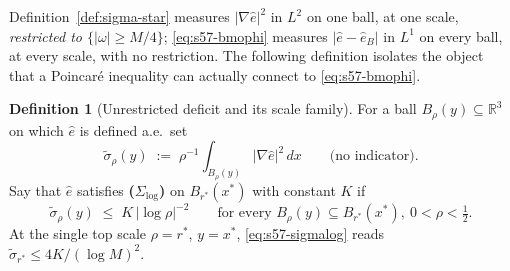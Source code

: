 \documentclass[11pt]{article}
\theoremstyle{definition}
\newtheorem{definition}[theorem]{Definition}
\theoremstyle{remark}
\newcommand{\R}{\mathbb{R}}
\begin{document}
Definition~\ref{def:sigma-star} measures $|\nabla\hat e|^2$ in $L^2$ on one
ball, at one scale, \emph{restricted to $\{|\omega|\geq M/4\}$};
\eqref{eq:s57-bmophi} measures $|\hat e-\hat e_B|$ in $L^1$ on every ball, at
every scale, with no restriction. The following definition isolates the
object that a Poincar\'e inequality can actually connect to
\eqref{eq:s57-bmophi}.

\begin{definition}[Unrestricted deficit and its scale family]
  \label{def:s57-sigma-tilde}
  For a ball $B_\rho(y)\subseteq\R^3$ on which $\hat e$ is defined a.e.\ set
  \begin{equation}\label{eq:s57-tilde}
    \tilde\sigma_\rho(y) \;:=\; \rho^{-1}\int_{B_\rho(y)}|\nabla\hat e|^2\,dx
    \qquad\text{(no indicator).}
  \end{equation}
  Say that $\hat e$ satisfies \textbf{($\Sigma_{\log}$)} on $B_{r^*}(x^*)$
  with constant $K$ if
  \begin{equation}\label{eq:s57-sigmalog}
    \tilde\sigma_\rho(y)\;\leq\;K\,|\log\rho|^{-2}
    \qquad\text{for every }B_\rho(y)\subseteq B_{r^*}(x^*),\ 0<\rho<\tfrac12 .
  \end{equation}
  At the single top scale $\rho=r^*$, $y=x^*$, \eqref{eq:s57-sigmalog} reads
  $\tilde\sigma_{r^*}\leq 4K/(\log M)^2$.
\end{definition}
\end{document}
